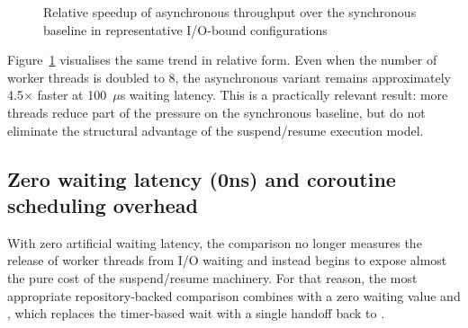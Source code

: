 \begin{figure}[H]
\centering
{}
\caption{Relative speedup of asynchronous throughput over the synchronous baseline in representative I/O-bound configurations}
\label{fig:async_speedup_cases}
\end{figure}

Figure~\ref{fig:async_speedup_cases} visualises the same trend in relative form. Even when the number of worker threads is doubled to 8, the asynchronous variant remains approximately 4.5$\times$ faster at 100~$\mu$s waiting latency. This is a practically relevant result: more threads reduce part of the pressure on the synchronous baseline, but do not eliminate the structural advantage of the suspend/resume execution model.

\subsection{Zero waiting latency (0ns) and coroutine scheduling overhead}

With zero artificial waiting latency, the comparison no longer measures the release of worker threads from I/O waiting and instead begins to expose almost the pure cost of the suspend/resume machinery. For that reason, the most appropriate repository-backed comparison combines  with a zero waiting value and , which replaces the timer-based wait with a single  handoff back to .

